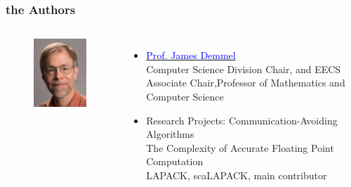 \documentclass{beamer}
\begin{document}
\begin{frame}
	\frametitle{the Authors}
	\begin{columns}[c] %
		
		\begin{figure}
			\includegraphics[width=0.7\linewidth]{figs/Demmel_2015_photo_v5.png}
		\end{figure}
		
		\begin{itemize}
			\item \href{https://people.eecs.berkeley.edu/~demmel/}{\textcolor{blue}{Prof. James Demmel}} \\Computer Science Division Chair, and EECS Associate Chair,Professor of Mathematics and Computer Science 
			\item Research Projects:
			Communication-Avoiding Algorithms \\
			The Complexity of Accurate Floating Point Computation \\
			LAPACK, scaLAPACK, main contributor
		\end{itemize}
		
	\end{columns}	
\end{frame}
\end{document}
